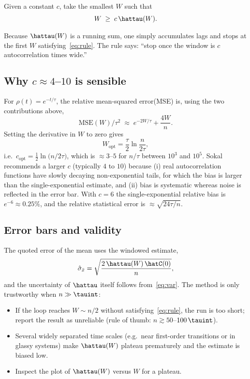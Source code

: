 \documentclass[a4paper, 10pt, onepage]{elegantbook}
\begin{document}
{\begin{description}[leftmargin=1.5em,style=nextline]
\item[rule.] Given a constant $c$, take the smallest $W$ such that
  \begin{equation}
    W\;\ge\;c\,\hattau(W).
    \label{eq:rule}
  \end{equation}
\end{description}

\noindent Because $\hattau(W)$ is a running sum, one simply accumulates lags
and stops at the first $W$ satisfying~\eqref{eq:rule}. The rule says: ``stop
once the window is $c$ autocorrelation times wide.''

\subsection{Why $c\approx 4$--$10$ is sensible}

For $\rho(t)=e^{-t/\tau}$, the relative mean-squared error(MSE) is, using the two
contributions above,
\begin{equation}
  \mathrm{MSE}(W)/\tau^2\;\approx\;e^{-2W/\tau}+\frac{4W}{n}.
\end{equation}
Setting the derivative in $W$ to zero gives
\begin{equation}
  W_{\mathrm{opt}}=\frac{\tau}{2}\ln\frac{n}{2\tau},
\end{equation}
i.e.\ $c_{\mathrm{opt}}=\tfrac12\ln\!\big(n/2\tau\big)$, which is
$\approx3$--$5$ for $n/\tau$ between $10^{3}$ and $10^{5}$. Sokal recommends
a larger $c$ (typically $4$ to $10$) because (i) real autocorrelation
functions have slowly decaying non-exponential tails, for which the bias is
larger than the single-exponential estimate, and (ii) bias is
systematic whereas noise is reflected in the error bar. With $c=6$ the
single-exponential relative bias is $e^{-6}\approx0.25\%$, and the relative
statistical error is $\approx\sqrt{24\tau/n}$.

\subsection{Error bars and validity}

The quoted error of the mean uses the windowed estimate,
\begin{equation}
  \hat\sigma_{\bar x}=\sqrt{\frac{2\,\hattau(W)\,\hatC(0)}{n}},
\end{equation}
and the uncertainty of $\hattau$ itself follows from~\eqref{eq:var}.
The method is only trustworthy when $n\gg\tauint$:
\begin{itemize}[nosep]
  \item If the loop reaches $W\sim n/2$ without satisfying~\eqref{eq:rule},
        the run is too short; report the result as unreliable
        (rule of thumb: $n\gtrsim 50$--$100\,\tauint$).
  \item Several widely separated time scales (e.g.\ near first-order
        transitions or in glassy systems) make $\hattau(W)$ plateau
        prematurely and the estimate is biased low.
  \item Inspect the plot of $\hattau(W)$ versus $W$ for a plateau.
\end{itemize}

}
\end{document}
